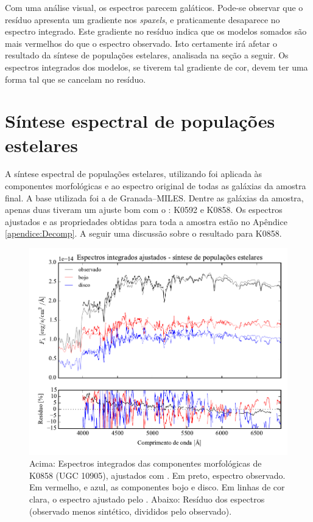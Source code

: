 Com uma análise visual, os espectros parecem galáticos. Pode-se observar que o
resíduo apresenta um gradiente nos {\em spaxels}, e praticamente desaparece no
espectro integrado. Este gradiente no resíduo indica que os modelos somados são
mais vermelhos do que o espectro observado. Isto certamente irá afetar o
resultado da síntese de populações estelares, analisada na seção a seguir. Os
espectros integrados dos modelos, se tiverem tal gradiente de cor, devem ter uma
forma tal que se cancelam no resíduo.

\section{Síntese espectral de populações estelares}

A síntese espectral de populações estelares, utilizando \starlight foi aplicada
às componentes morfológicas e ao espectro original de todas as galáxias da
amostra final. A base utilizada foi a de Granada--MILES. Dentre as galáxias da
amostra, apenas duas tiveram um ajuste bom com o \starlight: K0592 e K0858. Os
espectros ajustados e as propriedades obtidas para toda a amostra estão no
Apêndice \ref{apendice:Decomp}. A seguir uma discussão sobre o resultado para
K0858.

\begin{figure}
	\includegraphics[page=15,width=\textwidth]{figuras/sample006a_synthesis}
	\caption[Espectros ajustados com \starlight das componentes morfológicas de
	K0858 (UGC 10905)]
	{Acima: Espectros integrados das componentes morfológicas de
	K0858 (UGC 10905), ajustados com \starlight. Em preto, espectro observado. Em
	vermelho, e azul, as componentes bojo e disco. Em linhas de cor clara, o
	espectro ajustado pelo \starlight. Abaixo: Resíduo dos espectros (observado
	menos sintético, divididos pelo observado).}
	\label{fig:decompSinteseSpec}
\end{figure}


